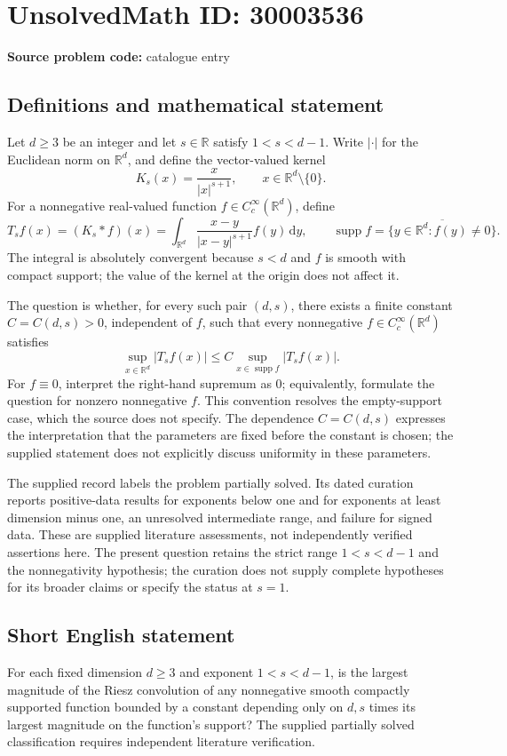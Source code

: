 \documentclass[11pt]{article}
\newcommand{\R}{\mathbb{R}}
\begin{document}
\section*{UnsolvedMath ID: 30003536}
\textbf{Source problem code:} catalogue entry
\subsection{Definitions and mathematical statement}
Let \(d\geq 3\) be an integer and let \(s\in\R\) satisfy \(1<s<d-1\). Write \(|\cdot|\) for the Euclidean norm on \(\R^d\), and define the vector-valued kernel
\[
K_s(x)=\frac{x}{|x|^{s+1}},\qquad x\in\R^d\setminus\{0\}.
\]
For a nonnegative real-valued function \(f\in C_c^\infty(\R^d)\), define
\[
T_s f(x)=(K_s*f)(x)=\int_{\R^d}\frac{x-y}{|x-y|^{s+1}}f(y)\,\mathrm{d}y,
\qquad
\operatorname{supp}f=\overline{\{y\in\R^d:f(y)\neq0\}}.
\]
The integral is absolutely convergent because \(s<d\) and \(f\) is smooth with compact support; the value of the kernel at the origin does not affect it.

The question is whether, for every such pair \((d,s)\), there exists a finite constant \(C=C(d,s)>0\), independent of \(f\), such that every nonnegative \(f\in C_c^\infty(\R^d)\) satisfies
\[
\sup_{x\in\R^d}|T_s f(x)|
\leq C\sup_{x\in\operatorname{supp}f}|T_s f(x)|.
\]
For \(f\equiv0\), interpret the right-hand supremum as \(0\); equivalently, formulate the question for nonzero nonnegative \(f\). This convention resolves the empty-support case, which the source does not specify. The dependence \(C=C(d,s)\) expresses the interpretation that the parameters are fixed before the constant is chosen; the supplied statement does not explicitly discuss uniformity in these parameters.

The supplied record labels the problem partially solved. Its dated curation reports positive-data results for exponents below one and for exponents at least dimension minus one, an unresolved intermediate range, and failure for signed data. These are supplied literature assessments, not independently verified assertions here. The present question retains the strict range \(1<s<d-1\) and the nonnegativity hypothesis; the curation does not supply complete hypotheses for its broader claims or specify the status at \(s=1\).
\subsection{Short English statement}
For each fixed dimension \(d\geq3\) and exponent \(1<s<d-1\), is the largest magnitude of the Riesz convolution of any nonnegative smooth compactly supported function bounded by a constant depending only on \(d,s\) times its largest magnitude on the function's support? The supplied partially solved classification requires independent literature verification.
\end{document}

